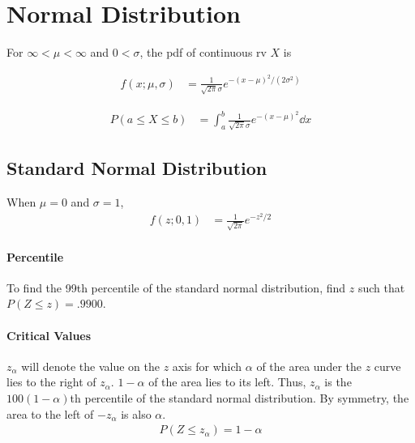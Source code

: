 \documentclass[paper=A4, pagesize, fontsize=7pt, DIV=calc]{scrartcl}
\begin{document}
\begin{minipage}[t]{.45\linewidth}
  \section{Normal Distribution}
  For $\infty < \mu < \infty$ and $0 < \sigma$, the pdf of continuous rv $X$ is \\
  \begin{minipage}{.5\linewidth}
    \begin{align*}
      f(x; \mu, \sigma) &= \frac{1}{\sqrt{2\pi}\sigma} e^{-(x - \mu)^2 / (2\sigma^2)}
    \end{align*}
  \end{minipage}%
  \begin{minipage}{.5\linewidth}
    \begin{align*}
      P(a \le X \le b) &= \int_{a}^{b} \frac{1}{\sqrt{2\pi}\sigma} e^{-(x - \mu)^2} \dd{x}
    \end{align*}
  \end{minipage}

  \subsection{Standard Normal Distribution}
  When $\mu = 0$ and $\sigma = 1$,
  \begin{align*}
    f(z; 0, 1) &= \frac{1}{\sqrt{2\pi}} e^{-z^2 / 2}
  \end{align*}

  \paragraph{Percentile}
  To find the 99th percentile of the standard normal distribution, find $z$ such that $P(Z \le z) = .9900$.

  \paragraph{Critical Values}
  $z_\alpha$ will denote the value on the $z$ axis for which $\alpha$ of the area under the $z$ curve lies to the right of $z_\alpha$. $1 - \alpha$ of the area lies to its left. Thus, $z_\alpha$ is the $100(1 - \alpha)$th percentile of the standard normal distribution. By symmetry, the area to the left of $-z_\alpha$ is also $\alpha$.
  \begin{align*}
    P(Z \le z_\alpha) = 1 - \alpha
  \end{align*}


\end{minipage}
\end{document}

